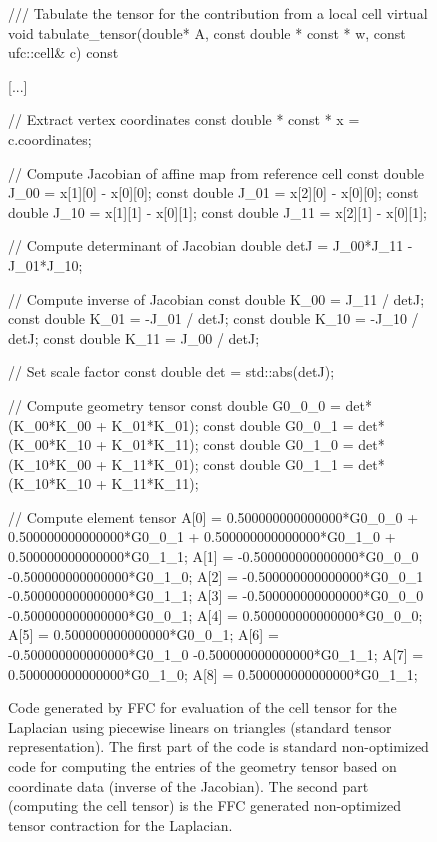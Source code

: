 \begin{figure}
\bwfig
  \scriptsize
  \begin{c++}
/// Tabulate the tensor for the contribution from a local cell
virtual void tabulate_tensor(double* A,
                             const double * const * w,
                             const ufc::cell& c) const
{
  [...]

  // Extract vertex coordinates
  const double * const * x = c.coordinates;

  // Compute Jacobian of affine map from reference cell
  const double J_00 = x[1][0] - x[0][0];
  const double J_01 = x[2][0] - x[0][0];
  const double J_10 = x[1][1] - x[0][1];
  const double J_11 = x[2][1] - x[0][1];

  // Compute determinant of Jacobian
  double detJ = J_00*J_11 - J_01*J_10;

  // Compute inverse of Jacobian
  const double K_00 =  J_11 / detJ;
  const double K_01 = -J_01 / detJ;
  const double K_10 = -J_10 / detJ;
  const double K_11 =  J_00 / detJ;

  // Set scale factor
  const double det = std::abs(detJ);

  // Compute geometry tensor
  const double G0_0_0 = det*(K_00*K_00 + K_01*K_01);
  const double G0_0_1 = det*(K_00*K_10 + K_01*K_11);
  const double G0_1_0 = det*(K_10*K_00 + K_11*K_01);
  const double G0_1_1 = det*(K_10*K_10 + K_11*K_11);

  // Compute element tensor
  A[0] = 0.500000000000000*G0_0_0 +
         0.500000000000000*G0_0_1 +
         0.500000000000000*G0_1_0 +
         0.500000000000000*G0_1_1;
  A[1] = -0.500000000000000*G0_0_0
         -0.500000000000000*G0_1_0;
  A[2] = -0.500000000000000*G0_0_1
         -0.500000000000000*G0_1_1;
  A[3] = -0.500000000000000*G0_0_0
         -0.500000000000000*G0_0_1;
  A[4] = 0.500000000000000*G0_0_0;
  A[5] = 0.500000000000000*G0_0_1;
  A[6] = -0.500000000000000*G0_1_0
         -0.500000000000000*G0_1_1;
  A[7] = 0.500000000000000*G0_1_0;
  A[8] = 0.500000000000000*G0_1_1;
}
  \end{c++}
  \caption{Code generated by FFC for evaluation of the cell tensor
    for the Laplacian using piecewise linears on triangles (standard
    tensor representation). The first part of the code is standard
    non-optimized code for computing the entries of the geometry
    tensor based on coordinate data (inverse of the Jacobian). The
    second part (computing the cell tensor) is the FFC generated
    non-optimized tensor contraction for the Laplacian.}
  \label{fig:code,poisson}
\end{figure}

